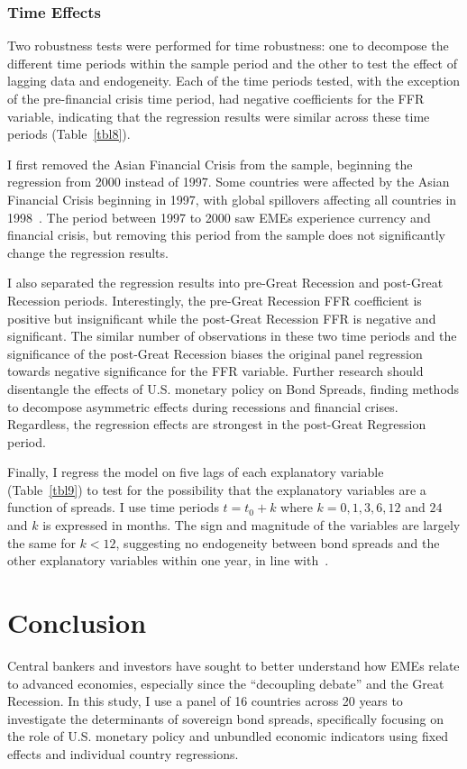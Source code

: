 \documentclass[12pt]{article}
\begin{document}
\subsubsection{Time Effects}
Two robustness tests were performed for time robustness: one to decompose the different time periods within the sample period and the other to test the effect of lagging data and endogeneity. Each of the time periods tested, with the exception of the pre-financial crisis time period, had negative coefficients for the FFR variable, indicating that the regression results were similar across these time periods (Table~\ref{tbl8}). 

I first removed the Asian Financial Crisis from the sample, beginning the regression from 2000 instead of 1997. Some countries  were affected by the Asian Financial Crisis beginning in 1997, with global spillovers affecting all countries in 1998~\parencite{corsetti99}. The period between 1997 to 2000 saw EMEs experience currency and financial crisis, but removing this period from the sample does not significantly change the regression results.

I also separated the regression results into pre-Great Recession and post-Great Recession periods. Interestingly, the pre-Great Recession FFR coefficient is positive but insignificant while the post-Great Recession FFR is negative and significant. The similar number of observations in these two time periods and the significance of the post-Great Recession biases the original panel regression towards negative significance for the FFR variable. Further research should disentangle the effects of U.S. monetary policy on Bond Spreads, finding methods to decompose asymmetric effects during recessions and financial crises. Regardless, the regression effects are strongest in the post-Great Regression period.

Finally, I regress the model on five lags of each explanatory variable (Table~\ref{tbl9}) to test for the possibility that the explanatory variables are a function of spreads. I use time periods $t = t_{0} + k$ where $k = 0, 1, 3, 6, 12$ and $24$ and $k$ is expressed in months. The sign and magnitude of the variables are largely the same for $k<12$, suggesting no endogeneity between bond spreads and the other explanatory variables within one year, in line with~\textcite{csonto13}.
%
%
%
%
%
\section{Conclusion}
\label{section:conclusion}
Central bankers and investors have sought to better understand how EMEs relate to advanced economies, especially since the ``decoupling debate'' and the Great Recession. In this study, I use a panel of 16 countries across 20 years to investigate the determinants of sovereign bond spreads, specifically focusing on the role of U.S. monetary policy and unbundled economic indicators using fixed effects and individual country regressions.
\end{document}
